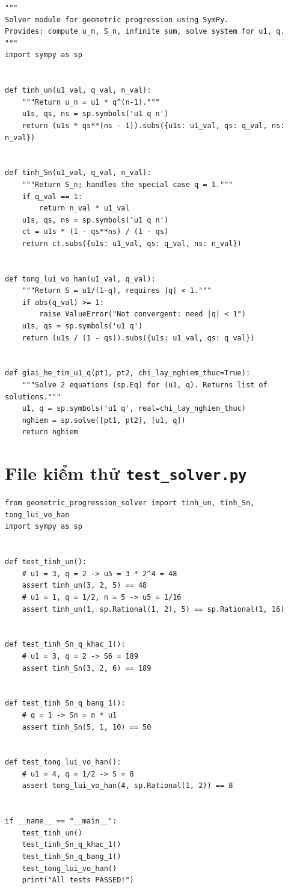 \documentclass[12pt,a4paper]{report}
\begin{document}
\begin{lstlisting}[caption={geometric\_progression\_solver.py -- đóng gói hàm}]
"""
Solver module for geometric progression using SymPy.
Provides: compute u_n, S_n, infinite sum, solve system for u1, q.
"""
import sympy as sp


def tinh_un(u1_val, q_val, n_val):
    """Return u_n = u1 * q^(n-1)."""
    u1s, qs, ns = sp.symbols('u1 q n')
    return (u1s * qs**(ns - 1)).subs({u1s: u1_val, qs: q_val, ns: n_val})


def tinh_Sn(u1_val, q_val, n_val):
    """Return S_n; handles the special case q = 1."""
    if q_val == 1:
        return n_val * u1_val
    u1s, qs, ns = sp.symbols('u1 q n')
    ct = u1s * (1 - qs**ns) / (1 - qs)
    return ct.subs({u1s: u1_val, qs: q_val, ns: n_val})


def tong_lui_vo_han(u1_val, q_val):
    """Return S = u1/(1-q), requires |q| < 1."""
    if abs(q_val) >= 1:
        raise ValueError("Not convergent: need |q| < 1")
    u1s, qs = sp.symbols('u1 q')
    return (u1s / (1 - qs)).subs({u1s: u1_val, qs: q_val})


def giai_he_tim_u1_q(pt1, pt2, chi_lay_nghiem_thuc=True):
    """Solve 2 equations (sp.Eq) for (u1, q). Returns list of solutions."""
    u1, q = sp.symbols('u1 q', real=chi_lay_nghiem_thuc)
    nghiem = sp.solve([pt1, pt2], [u1, q])
    return nghiem
\end{lstlisting}

\section{File kiểm thử \texttt{test\_solver.py}}

\begin{lstlisting}[caption={test\_solver.py -- kiểm thử đơn giản}]
from geometric_progression_solver import tinh_un, tinh_Sn, tong_lui_vo_han
import sympy as sp


def test_tinh_un():
    # u1 = 3, q = 2 -> u5 = 3 * 2^4 = 48
    assert tinh_un(3, 2, 5) == 48
    # u1 = 1, q = 1/2, n = 5 -> u5 = 1/16
    assert tinh_un(1, sp.Rational(1, 2), 5) == sp.Rational(1, 16)


def test_tinh_Sn_q_khac_1():
    # u1 = 3, q = 2 -> S6 = 189
    assert tinh_Sn(3, 2, 6) == 189


def test_tinh_Sn_q_bang_1():
    # q = 1 -> Sn = n * u1
    assert tinh_Sn(5, 1, 10) == 50


def test_tong_lui_vo_han():
    # u1 = 4, q = 1/2 -> S = 8
    assert tong_lui_vo_han(4, sp.Rational(1, 2)) == 8


if __name__ == "__main__":
    test_tinh_un()
    test_tinh_Sn_q_khac_1()
    test_tinh_Sn_q_bang_1()
    test_tong_lui_vo_han()
    print("All tests PASSED!")
\end{lstlisting}
\end{document}
